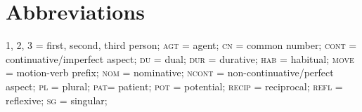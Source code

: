 \documentclass[output=paper]{LSP/langsci}
\begin{document}
\section*{Abbreviations}
1, 2, 3 = first, second, third person; \textsc{agt} = agent; \textsc{cn} = common number; \textsc{cont} = continuative/imperfect aspect; \textsc{du} = dual; \textsc{dur} = durative; \textsc{hab} = habitual; \textsc{move} = motion-verb prefix; \textsc{nom} = nominative; \textsc{ncont} = non-continuative/perfect aspect; \textsc{pl} = plural; \textsc{pat}= patient; \textsc{pot} = potential; \textsc{recip} = reciprocal; \textsc{refl} = reflexive; \textsc{sg} = singular; 

\printbibliography[heading=subbibliography,notkeyword=this]
\end{document}
